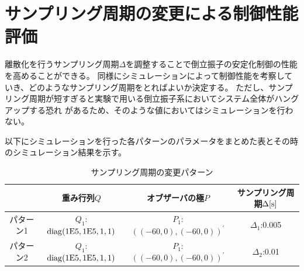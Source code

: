 \section{サンプリング周期の変更による制御性能評価}
	離散化を行うサンプリング周期$\Delta$を調整することで倒立振子の安定化制御の性能を高めることができる。
	同様にシミュレーションによって制御性能を考察していき、どのようなサンプリング周期をとればよいか決定する。
	ただし、サンプリング周期が短すぎると実験で用いる倒立振子系においてシステム全体がハングアップする恐れ
	があるため、そのような値においてはシミュレーションを行わない。
	\par
	以下にシミュレーションを行った各パターンのパラメータをまとめた表とその時のシミュレーション結果を示す。
	\begin{table}[htb]
		\begin{center}
			\caption{サンプリング周期の変更パターン}
			\medskip
			
			\begin{tabular}{|c|c|c|c|}\hline
				& 重み行列$Q$ & オブザーバの極$P$ & サンプリング周期$\Delta[\rm{s}]$ \\ \hline\hline
				パターン1 & $Q_1$:$\rm{diag}(1E5,1E5,1,1)$ & $P_1$:$((-60,0),(-60,0))^{'}$ & $\Delta_1$:0.005 \\ \hline
				パターン2 & $Q_1$:$\rm{diag}(1E5,1E5,1,1)$ & $P_1$:$((-60,0),(-60,0))^{'}$ & $\Delta_2$:0.01 \\ \hline
			\end{tabular}
		\end{center}
		\label{table:dt}
	\end{table}
	
